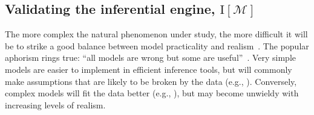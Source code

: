 \documentclass[oneside]{article}
\begin{document}



\subsection*{Validating the inferential engine, $\text{I}[\mathcal{M}]$}
\label{sec:sbc}

The more complex the natural phenomenon under study, the more difficult it will be to strike a good balance between model practicality and realism~\citep{levins1966}.
The popular aphorism rings true: ``all models are wrong but some are useful''~\citep{box79}.
Very simple models are easier to implement in efficient inference tools, but will commonly make assumptions that are likely to be broken by the data (e.g., \citealp{sullivan97,mendes17,mendes19}). 
Conversely, complex models will fit the data better (e.g., \citealp{ogilvie22}), but may become unwieldy with increasing levels of realism.
\end{document}

